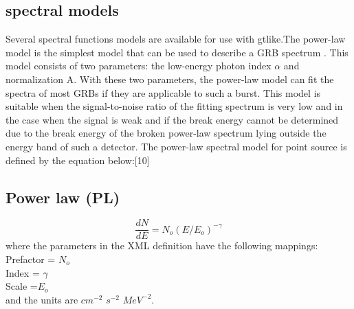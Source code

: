  \subsection{ spectral  models}
 Several  spectral  functions  models   are   available  for  use  with  gtlike.The  power-law  model  is  the  simplest  model   that   can  be  used   to   describe  a GRB spectrum . This   model   consists   of   two   parameters: the   low-energy   photon index $ \alpha $   and     normalization A.  With   these   two   parameters, the power-law   model   can   fit   the   spectra   of   most   GRBs if   they   are applicable   to   such   a burst.  This   model  is   suitable   when   the  signal-to-noise   ratio   of  the   fitting   spectrum   is   very   low   and  in   the case    when   the   signal  is   weak   and   if   the   break   energy   cannot  be determined   due   to   the    break   energy   of   the   broken  power-law   spectrum   lying   outside   the    energy   band   of   such   a detector. The power-law   spectral   model   for   point   source   is   defined   by   the equation below:[10]
\subsection{ Power law (PL) } 
\begin{equation}
\frac{dN}{dE} = N_{o} (E/ E_{o})^{-\gamma}
\end{equation}
where the parameters in the XML definition have the following mappings:\\
Prefactor = $N_{o}$\\
Index = $\gamma$\\
Scale =$E_{o}$\\
and the units are $ cm^{-2} $ $s^{-2}$ $ MeV^{-2} $. 
